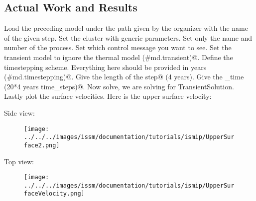 \subsection{Actual Work and Results} %
Load the preceding model under the path given by the organizer with the name of the given step. Set the cluster with generic parameters. Set only the name and number of the process. Set which control message you want to see. Set the transient model to ignore the thermal model \verb@(#md.transient)@. Define the timestepping scheme. Everything here should be provided in years \verb@(#md.timestepping)@. Give the length of the \verb@time step@ (4 years). Give the \verb@final_time (20*4 years time_steps)@. Now solve, we are solving for TransientSolution. Lastly plot the surface velocities. Here is the upper surface velocity:

Side view:
\begin{figure}[H]
	\begin{center}
		\texttt{[image: ../../../images/issm/documentation/tutorials/ismip/UpperSurface2.png]}
	\end{center}
\end{figure}
Top view:
\begin{figure}[H]
	\begin{center}
		\texttt{[image: ../../../images/issm/documentation/tutorials/ismip/UpperSurfaceVelocity.png]}
	\end{center}
\end{figure}
